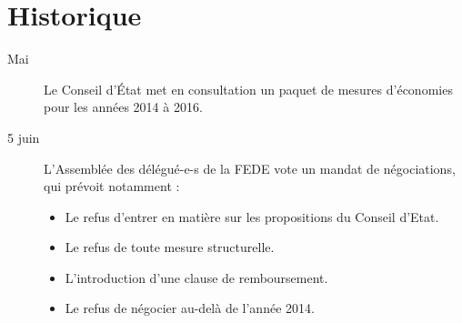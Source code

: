 
\chapter{Historique}%
\begin{description}%
	\item[Mai]%
		Le Conseil d'État met en consultation un paquet de mesures d'économies pour les années 2014 à 2016.

	\item[5 juin]%
		L’Assemblée des délégué-e-s de la FEDE vote un mandat de
		négociations, qui prévoit notamment :
		\begin{itemize}
			\item Le refus d’entrer en matière sur les propositions du Conseil d’Etat.
			\item Le refus de toute mesure structurelle.
			\item L’introduction d’une clause de remboursement.
			\item Le refus de négocier au-delà de l’année 2014.
		\end{itemize}
\end{description}

